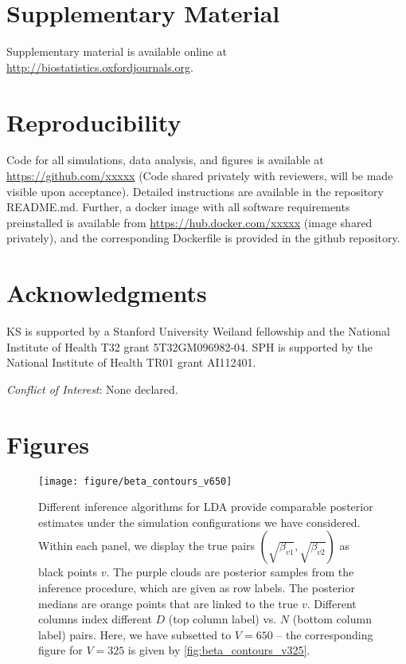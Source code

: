 \documentclass[oupdraft]{bio}
\begin{document}
\section{Supplementary Material}

Supplementary material is available online at
\url{http://biostatistics.oxfordjournals.org}.

\section{Reproducibility}

Code for all simulations, data analysis, and figures is available at
\url{https://github.com/xxxxx} (Code shared privately with reviewers, will be
made visible upon acceptance). Detailed instructions are available in the
repository README.md. Further, a docker image with all software requirements
preinstalled is available from \url{https://hub.docker.com/xxxxx} (image shared
privately), and the corresponding Dockerfile is provided in the github
repository.

\section*{Acknowledgments}

KS is supported by a Stanford University Weiland fellowship and the National
Institute of Health T32 grant 5T32GM096982-04. SPH is supported by the National
Institute of Health TR01 grant AI112401.

{\it Conflict of Interest}: None declared.




\section{Figures}

\begin{figure}[!p]
  \centering\texttt{[image: figure/beta\_contours\_v650]}
  \caption{Different inference algorithms for LDA provide comparable posterior
    estimates under the simulation configurations we have considered. Within
    each panel, we display the true pairs $\left(\sqrt{\beta_{v1}},
    \sqrt{\beta_{v2}}\right)$ as black points $v$. The purple clouds are
    posterior samples from the inference procedure, which are given as row
    labels. The posterior medians are orange points that are linked to the true
    $v$. Different columns index different $D$ (top column label) vs. $N$
    (bottom column label) pairs. Here, we have subsetted to $V = 650$ -- the
    corresponding figure for $V = 325$ is given by \ref{fig:beta_contours_v325}.
  }
  \label{fig:beta_contours_v650}
\end{figure}
\end{document}

